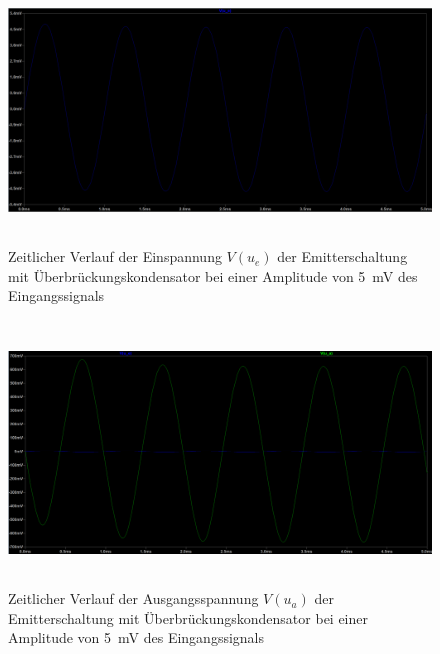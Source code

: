 \documentclass[12pt,english,ngerman]{scrartcl}
\begin{document}
\begin{figure}[H]
    \centering
    \includegraphics[width=\linewidth, height=7cm]{./figures/mitkond/eingangssignalmitueberbrueckung.png}
    \caption{Zeitlicher Verlauf der Einspannung $V(u_e)$ 
    der Emitterschaltung mit Überbrückungskondensator bei einer Amplitude von
  \SI{5}{mV} des Eingangssignals}
    \label{fig:sim_mit_normal_eingang}
\end{figure}

\begin{figure}[H]
    \centering
    \includegraphics[width=\linewidth, height=7cm]{./figures/mitkond/ausgangssignalmitueberbrueckung.png}
    \caption{Zeitlicher Verlauf der Ausgangsspannung $V(u_a)$
    der Emitterschaltung mit Überbrückungskondensator bei einer Amplitude von
  \SI{5}{mV} des Eingangssignals}
    \label{fig:sim_mit_normal_ausgang}
\end{figure}

\end{document}
